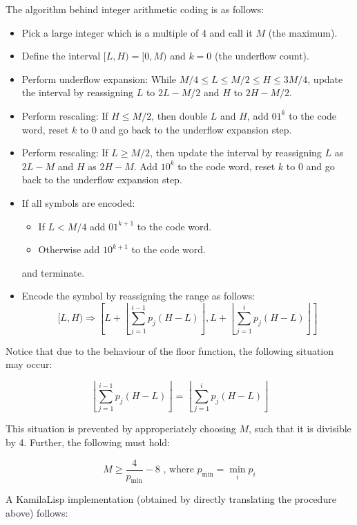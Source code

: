 The algorithm behind integer arithmetic coding is as follows:

\begin{itemize}
  \item Pick a large integer which is a multiple of 4 and call it $M$ (the maximum).
  \item Define the interval $[L, H) = [0, M)$ and $k=0$ (the underflow count).
  \item Perform underflow expansion: While $M/4 \leq L \leq M/2 \leq H \leq 3M/4$, update the interval by reassigning $L$ to $2L-M/2$ and $H$ to $2H-M/2$.
  \item Perform rescaling: If $H \le M/2$, then double $L$ and $H$, add $01^k$ to the code word, reset $k$ to 0 and go back to the underflow expansion step.
  \item Perform rescaling: If $L \ge M/2$, then update the interval by reassigning $L$ as $2L-M$ and $H$ as $2H-M$. Add $10^k$ to the code word, reset $k$ to 0 and go back to the underflow expansion step.
  \item If all symbols are encoded:
  \begin{itemize}
    \item If $L < M/4$ add $01^{k+1}$ to the code word.
    \item Otherwise add $10^{k+1}$ to the code word.
  \end{itemize}
  and terminate.
  \item Encode the symbol by reassigning the range as follows:
  $$
  [L, H) \Rightarrow \left[L+\left\lfloor\sum_{j=1}^{i-1} p_j(H-L)\right\rfloor, L+\left\lfloor\sum_{j=1}^{i} p_j(H-L)\right\rfloor\right]
  $$
\end{itemize}

Notice that due to the behaviour of the floor function, the following situation may occur:

$$
\left\lfloor\sum_{j=1}^{i-1} p_j(H-L)\right\rfloor = \left\lfloor\sum_{j=1}^{i} p_j(H-L)\right\rfloor
$$

This situation is prevented by approperiately choosing $M$, such that it is divisible by 4. Further, the following must hold:

$$
M \geq \frac{4}{p_\text{min}} - 8 \text{  , where  } p_\text{min} = \min_{i} p_i
$$

A KamilaLisp implementation (obtained by directly translating the procedure above) follows:

